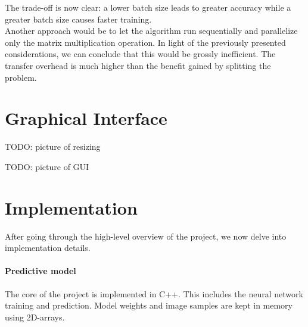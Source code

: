 \documentclass[a4paper]{article}
\begin{document}
The trade-off is now clear: a lower batch size leads to greater accuracy while a greater batch size causes faster training.
\\

Another approach would be to let the algorithm run sequentially and parallelize only the matrix multiplication operation. In light of the previously presented considerations, we can conclude that this would be grossly inefficient. The transfer overhead is much higher than the benefit gained by splitting the problem.

\begin{center}
\end{center}



\newpage
\section{Graphical Interface}
TODO: picture of resizing

TODO: picture of GUI



\newpage
\section{Implementation}
After going through the high-level overview of the project, we now delve into implementation details.

\paragraph{Predictive model} The core of the project is implemented in C++. This includes the neural network training and prediction. Model weights and image samples are kept in memory using 2D-arrays. 
\end{document}
